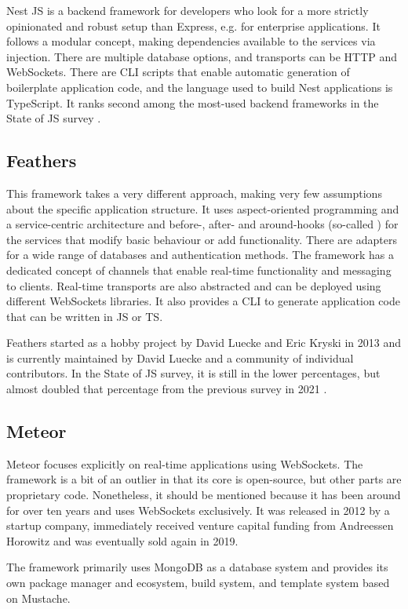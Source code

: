 Nest JS is a backend framework for developers who look for a more strictly opinionated and robust setup than Express, e.g. for enterprise applications. It follows a modular concept, making dependencies available to the services via injection. There are multiple database options, and transports can be HTTP and WebSockets. There are \ac{CLI} scripts that enable automatic generation of boilerplate application code, and the language used to build Nest applications is TypeScript. It ranks second among the most-used backend frameworks in the State of JS survey \parencite{mostUsedBackendFrameworks22}.

\subsection{Feathers}

This framework takes a very different approach, making very few assumptions about the specific application structure. It uses aspect-oriented programming and a service-centric architecture and before-, after- and around-hooks (so-called ) for the services that modify basic behaviour or add functionality. There are adapters for a wide range of databases and authentication methods. The framework has a dedicated concept of channels that enable real-time functionality and messaging to clients. Real-time transports are also abstracted and can be deployed using different WebSockets libraries. It also provides a \ac{CLI} to generate application code that can be written in \ac{JS} or \ac{TS}.

Feathers started as a hobby project by David Luecke and Eric Kryski in 2013 \parencite{feathersFrameworkHistory} and is currently maintained by David Luecke and a community of individual contributors. In the State of JS survey, it is still in the lower percentages, but almost doubled that percentage from the previous survey in 2021 \parencite{mostUsedBackendFrameworks21}.

\subsection{Meteor}

Meteor focuses explicitly on real-time applications using WebSockets. The framework is a bit of an outlier in that its core is open-source, but other parts are proprietary code. Nonetheless, it should be mentioned because it has been around for over ten years and uses WebSockets exclusively. It was released in 2012 by a startup company, immediately received venture capital funding from Andreessen Horowitz and was eventually sold again in 2019.

The framework primarily uses MongoDB as a database system and provides its own package manager and ecosystem, build system, and template system based on Mustache.
